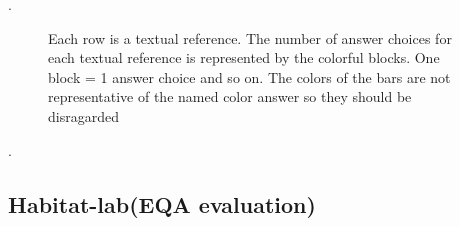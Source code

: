 \documentclass[11pt, a4paper]{article}
\begin{document}
. 
\begin{figure}[H]
    \centering
    \caption{Each row is a textual reference. The number of answer choices for each textual reference is represented by the colorful blocks. One block = 1 answer choice and so on. The colors of the bars are not representative of the named color answer so they should be disragarded}
\end{figure}.



\subsection{Habitat-lab(EQA evaluation)}
\end{document}
